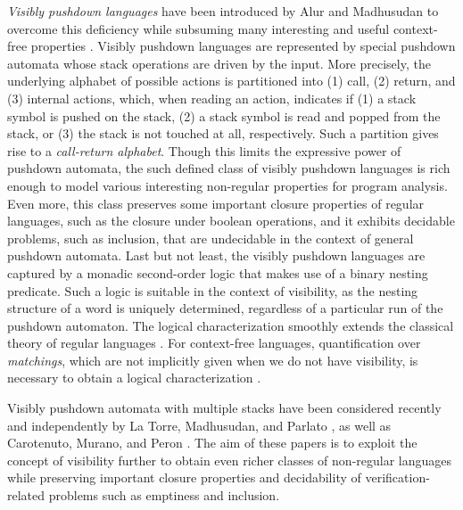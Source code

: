 \documentclass{LMCS}
\begin{document}
\emph{Visibly pushdown languages} have been introduced by Alur and Madhusudan
to overcome this deficiency while subsuming many interesting and useful
context-free properties \cite{AM2004}. Visibly pushdown languages are
represented by special pushdown automata whose stack operations are driven by
the input. More precisely, the underlying alphabet of possible actions is
partitioned into (1) call, (2) return, and (3) internal actions, which, when
reading an action, indicates if (1) a stack symbol is pushed on the stack, (2)
a stack symbol is read and popped from the stack, or (3) the stack is not
touched at all, respectively. Such a partition gives rise to a
\emph{call-return alphabet}. Though this limits the expressive power of
pushdown automata, the such defined class of visibly pushdown languages is
rich enough to model various interesting non-regular properties for program
analysis. Even more, this class preserves some important closure properties of
regular languages, such as the closure under boolean operations, and it
exhibits decidable problems, such as inclusion, that are undecidable in the
context of general pushdown automata. Last but not least, the visibly pushdown
languages are captured by a monadic second-order logic that makes use of a
binary nesting predicate. Such a logic is suitable in the context of
visibility, as the nesting structure of a word is uniquely determined,
regardless of a particular run of the pushdown automaton. The logical
characterization smoothly extends the classical theory of regular languages
\cite{Buechi:60,Elgot1961}. For context-free languages, quantification over
\emph{matchings}, which are not implicitly given when we do not have
visibility, is necessary to obtain a logical characterization
\cite{Schwentick94}.

Visibly pushdown automata with multiple stacks have been considered recently
and independently by La Torre, Madhusudan, and Parlato \cite{Madhusudan2007},
as well as Carotenuto, Murano, and Peron \cite{Murano2007}. The aim of these
papers is to exploit the concept of visibility further to obtain even richer
classes of non-regular languages while preserving important closure properties
and decidability of verification-related problems such as emptiness and
inclusion.
\end{document}
